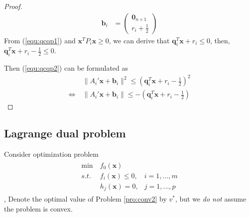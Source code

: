 \begin{proof}
\begin{align}
            \mathbf{b}_i &= \left(
                \begin{array}{ll}
                    \mathbf{0}_{n\times1} \\
                    r_i + \frac{1}{2}
                \end{array}\right)
    \end{align}
    From (\ref{equ:qcqp1}) and $\mathbf{x}^T P_i \mathbf{x} \geq 0$,
    we can derive that $\mathbf{q}_i^T \mathbf{x} + r_i \leq 0$,
    then, $\mathbf{q}_i^T \mathbf{x} + r_i - \frac{1}{2} \leq 0$.
    \par
    Then (\ref{equ:qcqp2}) can be formulated as
    \begin{align}
        &\parallel A_i'\mathbf{x} + \mathbf{b}_i \parallel^2
        \leq (\mathbf{q}_i^T \mathbf{x} + r_i - \frac{1}{2})^2 \\
        \Leftrightarrow \ & \parallel A_i'\mathbf{x} + \mathbf{b}_i \parallel
        \leq -(\mathbf{q}_i^T \mathbf{x} + r_i - \frac{1}{2})
    \end{align}
\end{proof}

\subsection{Lagrange dual problem}

Consider optimization problem
\begin{align}
    \begin{array}{lll}
        \min \ &f_0 (\mathbf{x}) \\
        s.t. \ &f_i (\mathbf{x}) \leq 0, &i = 1,..., m \\
         &h_j (\mathbf{x}) = 0, &j = 1,..., p
    \end{array}
    \label{pro:conv2}
\end{align},
Denote the optimal value of Problem \ref{pro:conv2} by
$v^*$, but we \emph{do not} assume the problem
is convex.

